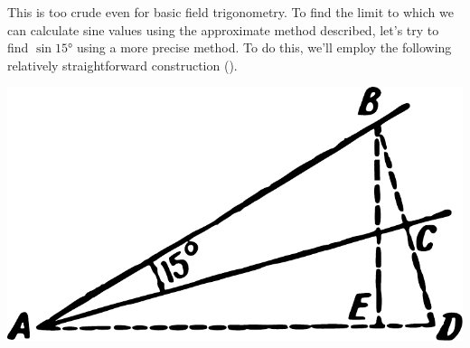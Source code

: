 This is too crude even for basic field trigonometry. To find the limit to which we can calculate sine values using the approximate method described, let's try to find $\sin \ang{15}$ using a more precise method. To do this, we'll employ the following relatively straightforward construction ().

\begin{marginfigure}%
\centering
\includegraphics[width=\textwidth]{figures/ch-05/fig-089.pdf}
\end{marginfigure}

